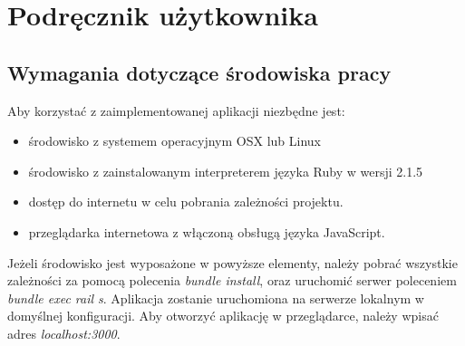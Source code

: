 \chapter{Podręcznik użytkownika}
\label{cha:podrecznik uzytkownika}

\section{Wymagania dotyczące środowiska pracy}
Aby korzystać z zaimplementowanej aplikacji niezbędne jest:
\begin{itemize}
\item środowisko z systemem operacyjnym OSX lub Linux
\item środowisko z zainstalowanym interpreterem języka Ruby w wersji 2.1.5
\item dostęp do internetu w celu pobrania zależności projektu.
\item przeglądarka internetowa z włączoną obsługą języka JavaScript.
\end{itemize}
Jeżeli środowisko jest wyposażone w powyższe elementy, należy pobrać wszystkie zależności za pomocą polecenia \textit{bundle install}, oraz uruchomić serwer poleceniem \textit{bundle exec rail s}. Aplikacja zostanie uruchomiona na serwerze lokalnym w domyślnej konfiguracji. Aby otworzyć aplikację w przeglądarce, należy wpisać adres \textit{localhost:3000}.

\newpage

